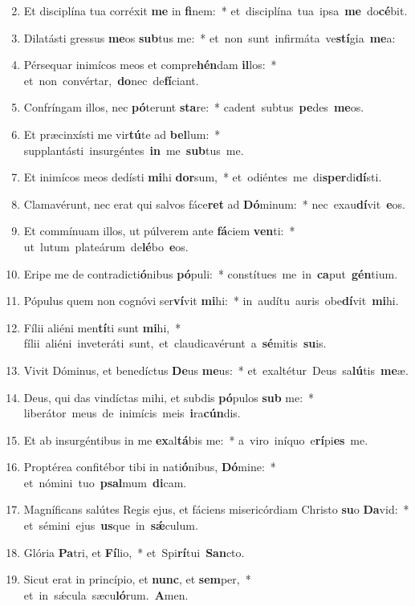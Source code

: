 \begin{flushleft}
\begin{enumerate}[leftmargin=*]
\setcounter{enumi}{1}

\item Et disciplína tua corréxit \textbf{me} in \textbf{fi}nem:~* \mbox{et disciplína tua ipsa \textbf{me} do\textbf{cé}bit.}
\item Dilatásti gressus \textbf{me}os \textbf{sub}tus me:~* \mbox{et non sunt infirmáta ve\textbf{stí}gia \textbf{me}a:}
\item Pérsequar inimícos meos et compre\textbf{hén}dam \textbf{il}los:~* \mbox{et non convértar, \textbf{do}nec de\textbf{fí}ciant.}
\item Confríngam illos, nec \textbf{pó}terunt \textbf{sta}re:~* \mbox{cadent subtus \textbf{pe}des \textbf{me}os.}
\item Et præcinxísti me vir\textbf{tú}te ad \textbf{bel}lum:~* \mbox{supplantásti insurgéntes \textbf{in} me \textbf{sub}tus me.}
\item Et inimícos meos dedísti \textbf{mi}hi \textbf{dor}sum,~* \mbox{et odiéntes me di\textbf{sper}di\textbf{dí}sti.}
\item Clamavérunt, nec erat qui salvos fáce\textbf{ret} ad \textbf{Dó}minum:~* \mbox{nec exau\textbf{dí}vit \textbf{e}os.}
\item Et commínuam illos, ut púlverem ante \textbf{fá}ciem \textbf{ven}ti:~* \mbox{ut lutum plateárum de\textbf{lé}bo \textbf{e}os.}
\item Eripe me de contradicti\textbf{ó}nibus \textbf{pó}puli:~* \mbox{constítues me in \textbf{ca}put \textbf{gén}tium.}
\item Pópulus quem non cognóvi ser\textbf{ví}vit \textbf{mi}hi:~* \mbox{in audítu auris obe\textbf{dí}vit \textbf{mi}hi.}
\item Fílii aliéni men\textbf{tí}ti sunt \textbf{mi}hi,~* \mbox{fílii aliéni inveteráti sunt, et claudicavérunt a \textbf{sé}mitis \textbf{su}is.}
\item Vivit Dóminus, et benedíctus \textbf{De}us \textbf{me}us:~* \mbox{et exaltétur Deus sa\textbf{lú}tis \textbf{me}æ.}
\item Deus, qui das vindíctas mihi, et subdis \textbf{pó}pulos \textbf{sub} me:~* \mbox{liberátor meus de inimícis meis \textbf{i}ra\textbf{cún}dis.}
\item Et ab insurgéntibus in me \textbf{ex}al\textbf{tá}bis me:~* \mbox{a viro iníquo e\textbf{rí}pi\textbf{es} me.}
\item Proptérea confitébor tibi in nati\textbf{ó}nibus, \textbf{Dó}mine:~* \mbox{et nómini tuo \textbf{psal}mum \textbf{di}cam.}
\item Magníficans salútes Regis ejus, et fáciens misericórdiam Christo \textbf{su}o \textbf{Da}vid:~* \mbox{et sémini ejus \textbf{us}que in \textbf{s\'{\ae}}culum.}
\item Glória \textbf{Pa}tri, et \textbf{Fí}lio,~* \mbox{et Spi\textbf{rí}tui \textbf{San}cto.}
\item Sicut erat in princípio, et \textbf{nunc}, et \textbf{sem}per,~* \mbox{et in s\'{\ae}cula sæcu\textbf{ló}rum. \textbf{A}men.}

\end{enumerate}
\end{flushleft}

